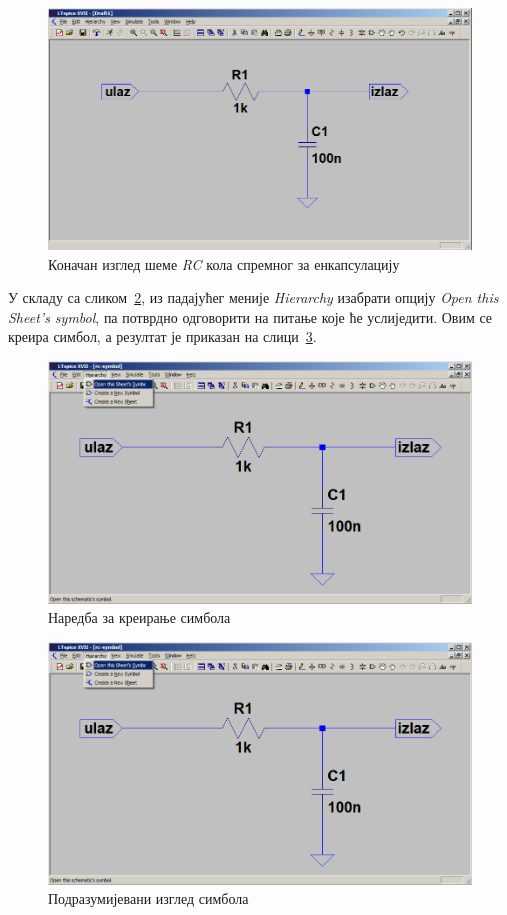 \begin{figure}[h]
\centering
\includegraphics[width=\figwidth\textwidth]{figs/rc-symbol2.PNG}
\caption{Коначан изглед шеме \textit{RC} кола спремног за енкапсулацију}
\label{Fig:rc-symbol2}
\end{figure}

У складу са сликом~\ref{Fig:rc-symbol3}, из падајућег меније \textit{Hierarchy} изабрати опцију \textit{Open this Sheet's symbol}, па потврдно одговорити на питање које ће услиједити. Овим се креира симбол, а резултат је приказан на слици~\ref{Fig:rc-symbol5}.

\begin{figure}[h]
\centering
\includegraphics[width=\figwidth\textwidth]{figs/rc-symbol3.PNG}
\caption{Наредба за креирање симбола}
\label{Fig:rc-symbol3}
\end{figure}

\begin{figure}[h]
\centering
\includegraphics[width=\figwidth\textwidth]{figs/rc-symbol3.PNG}
\caption{Подразумијевани изглед симбола}
\label{Fig:rc-symbol5}
\end{figure}

